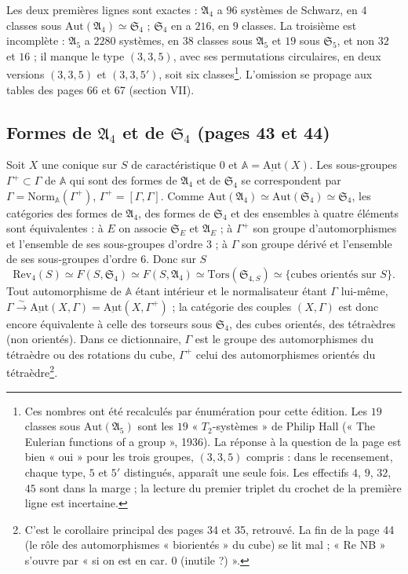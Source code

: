 \documentclass[11pt,a4paper]{article}
\begin{document}
Les deux premières lignes sont exactes : $\mathfrak{A}_4$ a $96$ systèmes de
Schwarz, en $4$ classes sous $\mathrm{Aut}(\mathfrak{A}_4) \simeq
\mathfrak{S}_4$ ; $\mathfrak{S}_4$ en a $216$, en $9$ classes. La troisième
est incomplète : $\mathfrak{A}_5$ a $2280$ systèmes, en $38$ classes sous
$\mathfrak{A}_5$ et $19$ sous $\mathfrak{S}_5$, et non $32$ et $16$ ; il manque
le type $(3, 3, 5)$, avec ses permutations circulaires, en deux versions
$(3, 3, 5)$ et $(3, 3, 5')$, soit six classes\footnote{Ces nombres ont été
recalculés par énumération pour cette édition. Les $19$ classes sous
$\mathrm{Aut}(\mathfrak{A}_5)$ sont les $19$ « $T_2$-systèmes » de Philip Hall
(« The Eulerian functions of a group », 1936). La
réponse à la question de la page est bien « oui » pour les trois groupes,
$(3, 3, 5)$ compris : dans le recensement, chaque type, $5$ et $5'$
distingués, apparaît une seule fois. Les effectifs $4$, $9$, $32$, $45$ sont
dans la marge ; la lecture du premier triplet du crochet de la première ligne
est incertaine.}. L'omission se propage aux tables des pages 66 et 67
(section VII).

\subsection*{Formes de $\mathfrak{A}_4$ et de $\mathfrak{S}_4$ (pages 43 et 44)}

Soit $X$ une conique sur $S$ de caractéristique $0$ et $\mathbb{A} =
\underline{\mathrm{Aut}}(X)$. Les sous-groupes $\Gamma^+ \subset \Gamma$ de
$\mathbb{A}$ qui sont des formes de $\mathfrak{A}_4$ et de $\mathfrak{S}_4$ se
correspondent par $\Gamma = \mathrm{Norm}_{\mathbb{A}}(\Gamma^+)$, $\Gamma^+ =
[\Gamma, \Gamma]$. Comme $\mathrm{Aut}(\mathfrak{A}_4) \simeq
\mathrm{Aut}(\mathfrak{S}_4) \simeq \mathfrak{S}_4$, les catégories des formes
de $\mathfrak{A}_4$, des formes de $\mathfrak{S}_4$ et des ensembles à quatre
éléments sont équivalentes : à $E$ on associe $\mathfrak{S}_E$ et
$\mathfrak{A}_E$ ; à $\Gamma^+$ son groupe d'automorphismes et l'ensemble de
ses sous-groupes d'ordre $3$ ; à $\Gamma$ son groupe dérivé et l'ensemble de
ses sous-groupes d'ordre $6$. Donc sur $S$
\[
  \mathrm{Rev}_4(S) \simeq F(S, \mathfrak{S}_4) \simeq F(S, \mathfrak{A}_4)
  \simeq \mathrm{Tors}(\mathfrak{S}_{4,S}) \simeq \{\text{cubes orientés sur }
  S\} .
\]
Tout automorphisme de $\mathbb{A}$ étant intérieur et le normalisateur étant
$\Gamma$ lui-même, $\Gamma \xrightarrow{\sim} \underline{\mathrm{Aut}}(X,
\Gamma) = \underline{\mathrm{Aut}}(X, \Gamma^+)$ ; la catégorie des couples
$(X, \Gamma)$ est donc encore équivalente à celle des torseurs sous
$\mathfrak{S}_4$, des cubes orientés, des tétraèdres (non orientés). Dans ce
dictionnaire, $\Gamma$ est le groupe des automorphismes du tétraèdre ou des
rotations du cube, $\Gamma^+$ celui des automorphismes orientés du
tétraèdre\footnote{C'est le corollaire principal des pages 34 et 35, retrouvé.
La fin de la page 44 (le rôle des automorphismes « biorientés » du cube) se lit mal ; « Re
NB » s'ouvre par « si on est en car. 0 (inutile ?) ».}.
\end{document}
